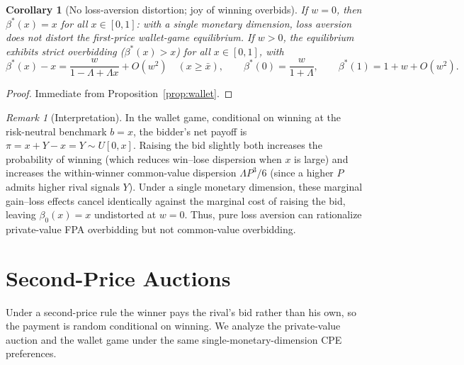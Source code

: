 \documentclass[11pt,a4paper]{article}
\newtheorem{corollary}{Corollary}
\theoremstyle{remark}
\newtheorem{remark}{Remark}
\begin{document}
\begin{corollary}[No loss-aversion distortion; joy of winning overbids]
\label{cor:wallet}
If $w=0$, then $\beta^{*}(x)=x$ for all $x\in[0,1]$: with a single monetary
dimension, loss aversion does \emph{not} distort the first-price wallet-game
equilibrium. If $w>0$, the equilibrium exhibits strict overbidding
($\beta^{*}(x)>x$) for all $x\in[0,1]$, with
\begin{equation}
\beta^{*}(x)-x=\frac{w}{1-\Lambda+\Lambda x}+O(w^{2}) \quad (x\ge\bar x),
\qquad
\beta^{*}(0)=\frac{w}{1+\Lambda},\qquad
\beta^{*}(1)=1+w+O(w^{2}) .
\end{equation}
\end{corollary}

\begin{proof}
Immediate from Proposition~\ref{prop:wallet}.
\end{proof}

\begin{remark}[Interpretation]
In the wallet game, conditional on winning at the risk-neutral benchmark $b=x$, the
bidder's net payoff is $\pi=x+Y-x=Y\sim U[0,x]$. Raising the bid slightly both
increases the probability of winning (which reduces win--lose dispersion when $x$ is
large) and increases the within-winner common-value dispersion $\Lambda P^3/6$ (since
a higher $P$ admits higher rival signals $Y$). Under a single monetary dimension,
these marginal gain--loss effects cancel identically against the marginal cost of
raising the bid, leaving $\beta_0(x)=x$ undistorted at $w=0$. Thus, pure loss
aversion can rationalize private-value FPA overbidding but not common-value
overbidding.
\end{remark}

\section{Second-Price Auctions}
\label{sec:spa}
Under a second-price rule the winner pays the rival's bid rather than his own, so the
payment is random conditional on winning. We analyze the private-value auction and
the wallet game under the same single-monetary-dimension CPE preferences.
\end{document}
